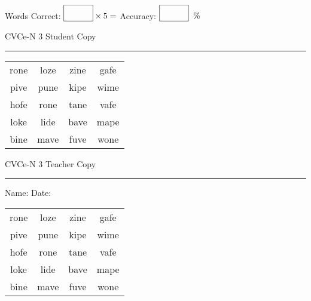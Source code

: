 \documentclass{memoir}
\begin{document}
\small

Words Correct: $\fbox{\phantom{\huge 100}} \times 5 = $ Accuracy: $\fbox{\phantom{\huge 100}}\;\; \%$ 

\vfill

\newpage


\footnotesize \noindent
CVCe-N 3 \hfill Student Copy
\smallskip
\hrule

\Large

\setlength{\tabcolsep}{14pt}
\def\arraystretch{2}

{\selectfont


\begin{vplace}[0.5]
\begin{center}
\begin{tabular}{cccc}
rone & loze & zine & gafe \\
pive & pune & kipe & wime \\
hofe & rone & tane & vafe \\
loke & lide & bave & mape \\
bine & mave & fuve & wone \\
\end{tabular}
\end{center}
\end{vplace}

}

\newpage

\footnotesize \noindent
CVCe-N 3 \hfill Teacher Copy
\smallskip
\hrule

\small

\vfill

\noindent
Name: \underline{\hspace{1.75in}} \hfill Date: \underline{\hspace{1in}}

\Large

{\selectfont


\begin{vplace}[0.5]
\begin{center}
\begin{tabular}{cccc}
rone & loze & zine & gafe \\
pive & pune & kipe & wime \\
hofe & rone & tane & vafe \\
loke & lide & bave & mape \\
bine & mave & fuve & wone \\
\end{tabular}
\end{center}
\end{vplace}



}
\end{document}
